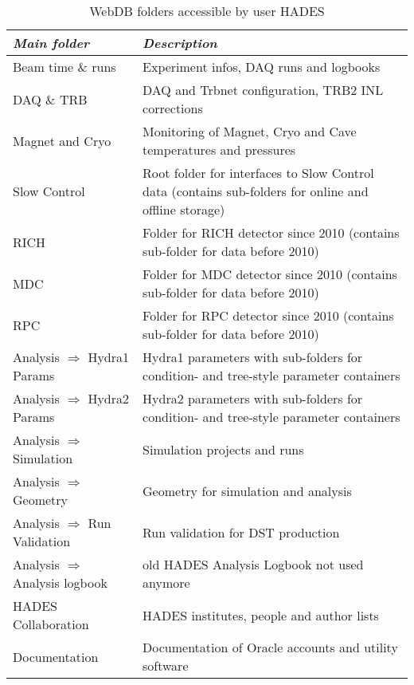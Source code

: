 \begin{table}[h]
\centering
\begin{tabular}{ | m{4.2cm} | m{11cm} | }
\hline
\cellcolor{lightgray} \textsl{Main folder} &
\cellcolor{lightgray} \textsl{Description}\\ \hline
Beam time \& runs                       & Experiment infos, DAQ runs and logbooks\\ \hline
DAQ \& TRB                              & DAQ and Trbnet configuration, TRB2 INL corrections\\ \hline
Magnet and Cryo                         & Monitoring of Magnet, Cryo and Cave temperatures and pressures\\ \hline
Slow Control                            & Root folder for interfaces to Slow Control data (contains sub-folders for online and offline storage)\\ \hline
RICH                                    & Folder for RICH detector since 2010 (contains sub-folder for data before 2010)\\ \hline
MDC                                     & Folder for MDC detector since 2010 (contains sub-folder for data before 2010)\\ \hline
RPC                                     & Folder for RPC detector since 2010 (contains sub-folder for data before 2010)\\ \hline
Analysis $\Rightarrow$ Hydra1 Params    & Hydra1 parameters with sub-folders for condition- and tree-style parameter containers\\ \hline
Analysis $\Rightarrow$ Hydra2 Params    & Hydra2 parameters with sub-folders for condition- and tree-style parameter containers\\ \hline
Analysis $\Rightarrow$ Simulation       &Simulation projects and runs\\ \hline
Analysis $\Rightarrow$ Geometry         &Geometry for simulation and analysis\\ \hline
Analysis $\Rightarrow$ Run Validation   &Run validation for DST production\\ \hline
Analysis $\Rightarrow$ Analysis logbook & old HADES Analysis Logbook not used anymore\\ \hline
HADES Collaboration                     & HADES institutes, people and author lists\\ \hline
Documentation                           & Documentation of Oracle accounts and utility software\\ \hline
\end{tabular}
\caption[WebDB folders accessible by user HADES]{WebDB folders accessible by user HADES} \label{tab:webdbFolders}
\end{table}


